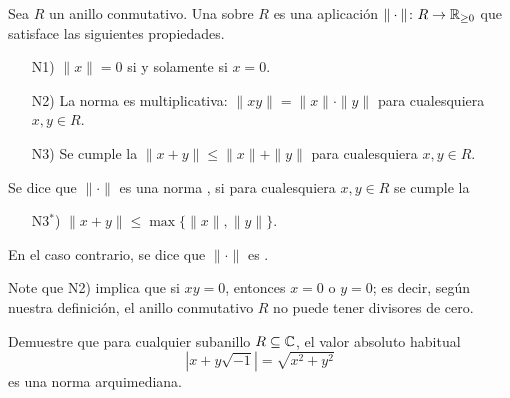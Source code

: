 \documentclass{article}
\numberwithin{equation}{section}
\theoremstyle{definition}
\begin{document}
\begin{definicion}
  \label{dfn:norma-sobre-cuerpo}
  Sea $R$ un anillo conmutativo. Una  sobre $R$ es una aplicación
  $\|\cdot\|\colon R\to \mathbb{R}_{\ge 0}$ que satisface las siguientes propiedades.
  \begin{enumerate}
  \item[N1)] $\|x\| = 0$ si y solamente si $x = 0$.

  \item[N2)] La norma es multiplicativa: $\|xy\| = \|x\|\cdot \|y\|$ para
    cualesquiera $x,y\in R$.

  \item[N3)] Se cumple la 
    $\|x + y\| \le \|x\| + \|y\|$ para cualesquiera $x,y\in R$.
  \end{enumerate}

  Se dice que $\|\cdot\|$ es una norma , si para
  cualesquiera $x,y\in R$ se cumple la 
  \begin{enumerate}
  \item[N3${}^*$)] $\|x + y\| \le \max \{ \|x\|, \|y\| \}$.
  \end{enumerate}
  En el caso contrario, se dice que $\|\cdot\|$ es
  .
\end{definicion}

Note que N2) implica que si $xy = 0$, entonces $x = 0$ o $y = 0$; es decir,
según nuestra definición, el anillo conmutativo $R$ no puede tener divisores
de cero.

\begin{ejemplo}
  Demuestre que para cualquier subanillo $R\subseteq \mathbb{C}$, el valor absoluto
  habitual
  $$|x+y\sqrt{-1}| = \sqrt{x^2 + y^2}$$
  es una norma arquimediana.
\end{ejemplo}
\end{document}
